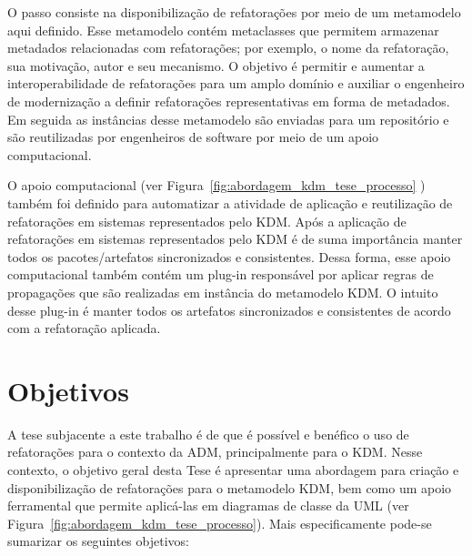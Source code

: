 O passo  consiste na disponibilização de refatorações por meio de um metamodelo aqui definido. Esse metamodelo contém metaclasses que permitem armazenar metadados relacionadas com refatorações; por exemplo, o nome da refatoração, sua motivação, autor e seu mecanismo. O objetivo é permitir e aumentar a interoperabilidade de refatorações para um amplo domínio e auxiliar o engenheiro de modernização a definir refatorações representativas em forma de metadados. Em seguida as instâncias desse metamodelo são enviadas para um repositório e são reutilizadas por engenheiros de software por meio de um apoio computacional. 


O apoio computacional (ver Figura~\ref{fig:abordagem_kdm_tese_processo} )  também foi definido para automatizar a atividade de aplicação e reutilização de refatorações em sistemas representados pelo KDM. Após a aplicação de refatorações em sistemas representados pelo KDM é de suma importância manter todos os pacotes/artefatos sincronizados e consistentes. Dessa forma, esse apoio computacional também contém um plug-in responsável por aplicar regras de propagações que são realizadas em instância do metamodelo KDM. O intuito desse plug-in é manter todos os artefatos sincronizados e consistentes de acordo com a refatoração aplicada. 

\section{Objetivos}\label{sec:objetivos}

A tese subjacente a este trabalho é de que é possível e benéfico o uso de refatorações para o contexto da ADM, principalmente para o KDM. Nesse contexto, o objetivo geral desta Tese é apresentar uma abordagem para criação e disponibilização de refatorações para o metamodelo KDM, bem como um apoio ferramental que permite aplicá-las em diagramas de classe da UML (ver Figura~\ref{fig:abordagem_kdm_tese_processo}). Mais especificamente pode-se sumarizar os seguintes objetivos:%

